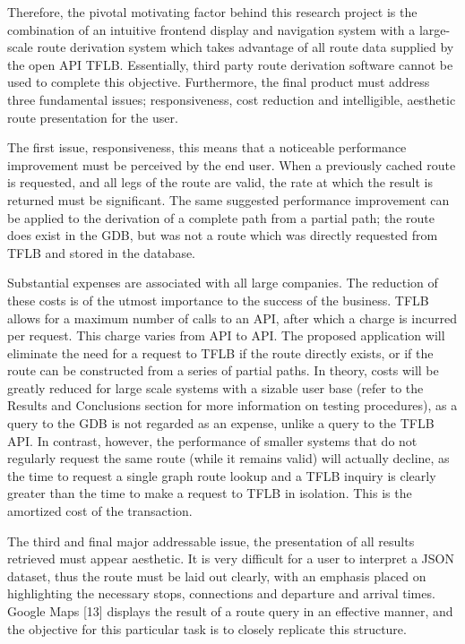 \documentclass[12pt]{article}   	%
\begin{document}
Therefore, the pivotal motivating factor behind this research project is the combination of an intuitive frontend display and navigation system with a large-scale route derivation system which takes advantage of all route data supplied by the open API TFLB. Essentially, third party route derivation software cannot be used to complete this objective. Furthermore, the final product must address three fundamental issues; responsiveness, cost reduction and intelligible, aesthetic route presentation for the user.
	
The first issue, responsiveness, this means that a noticeable performance improvement must be perceived by the end user. When a previously cached route is requested, and all legs of the route are valid, the rate at which the result is returned must be significant. The same suggested performance improvement can be applied to the derivation of a complete path from a partial path; the route does exist in the GDB, but was not a route which was directly requested from TFLB and stored in the database.
	
Substantial expenses are associated with all large companies. The reduction of these costs is of the utmost importance to the success of the business. TFLB allows for a maximum number of calls to an API, after which a charge is incurred per request. This charge varies from API to API. The proposed application will eliminate the need for a request to TFLB if the route directly exists, or if the route can be constructed from a series of partial paths. In theory, costs will be greatly reduced for large scale systems with a sizable user base (refer to the Results and Conclusions section for more information on testing procedures), as a query to the GDB is not regarded as an expense, unlike a query to the TFLB API. In contrast, however, the performance of smaller systems that do not regularly request the same route (while it remains valid) will actually decline, as the time to request a single graph route lookup and a TFLB inquiry is clearly greater than the time to make a request to TFLB in isolation. This is the amortized cost of the transaction.

The third and final major addressable issue, the presentation of all results retrieved must appear aesthetic. It is very difficult for a user to interpret a JSON dataset, thus the route must be laid out clearly, with an emphasis placed on highlighting the necessary stops, connections and departure and arrival times. Google Maps [13] displays the result of a route query in an effective manner, and the objective for this particular task is to closely replicate this structure.
\end{document}
